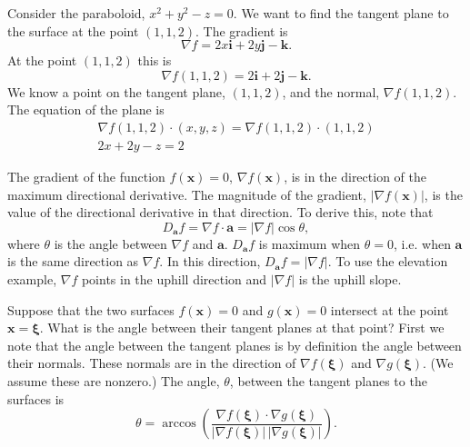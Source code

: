 \begin{Example}
  Consider the paraboloid, $x^2 + y^2 - z = 0$.  We want to find the tangent
  plane to the surface at the point $(1,1,2)$.  The gradient is
  \[
  \nabla f = 2 x \mathbf{i} + 2 y \mathbf{j} - \mathbf{k}.
  \]
  At the point $(1,1,2)$ this is
  \[
  \nabla f(1,1,2) = 2 \mathbf{i} + 2 \mathbf{j} - \mathbf{k}.
  \]
  We know a point on the tangent plane, $(1,1,2)$, and the normal, 
  $\nabla f(1,1,2)$.  The equation of the plane is
  \begin{gather*}
    \nabla f(1,1,2) \cdot (x, y, z) = \nabla f(1,1,2) \cdot (1,1,2) \\
    \boxed{
      2 x + 2 y - z = 2
      }
  \end{gather*}
\end{Example}




The gradient of the function $f(\mathbf{x}) = 0$, $\nabla f(\mathbf{x})$, is in 
the direction of the maximum directional derivative.   The magnitude 
of the gradient, $|\nabla f(\mathbf{x})|$, is the value of the directional
derivative in that direction.  To derive this, note that
\[
D_{\mathbf{a}} f = \nabla f \cdot \mathbf{a} = |\nabla f| \cos \theta,
\]
where $\theta$ is the angle between $\nabla f$ and $\mathbf{a}$.
$D_{\mathbf{a}} f$ is maximum when $\theta = 0$, i.e. when $\mathbf{a}$ is 
the same direction as $\nabla f$.  In this direction, 
$D_{\mathbf{a}} f = |\nabla f|$.
To use the elevation example, $\nabla f$ points in the uphill direction and
$|\nabla f|$ is the uphill slope.





\begin{Example}
  Suppose that the two surfaces $f(\mathbf{x}) = 0$ and $g(\mathbf{x}) = 0$ 
  intersect at the point $\mathbf{x} = \boldsymbol{\xi}$.  What is the angle between
  their tangent planes at that point?  First we note that the angle between
  the tangent planes is by definition the angle between their normals.
  These normals are in the direction of $\nabla f(\boldsymbol{\xi})$ and 
  $\nabla g(\boldsymbol{\xi})$.  (We assume these are nonzero.)  The angle, $\theta$,
  between the tangent planes to the surfaces is
  \[
  \boxed{
    \theta = \arccos \left( \frac{ \nabla f(\boldsymbol{\xi}) \cdot \nabla g(\boldsymbol{\xi}) }
      { | \nabla f(\boldsymbol{\xi}) |\,| \nabla g(\boldsymbol{\xi}) | } \right).
    }
  \]
\end{Example}








